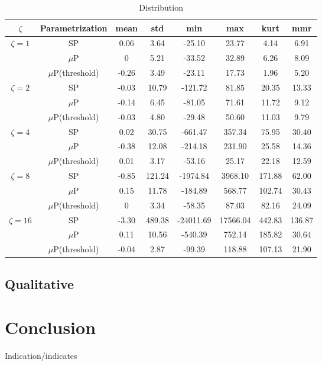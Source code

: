 \documentclass{article}
\newcommand{\mup}{$\mu$P}
\begin{document}
\begin{table}[h!]
\centering
\begin{tabular}{cccccccc}
\toprule
$\zeta$ & Parametrization & mean & std & min & max & kurt & mmr\\
\midrule
\multirow{3}{*}{$\zeta=1$} & SP & 0.06 & 3.64 & -25.10 & 23.77 & 4.14 & 6.91 \\
& \mup & 0 & 5.21 & -33.52 & 32.89 & 6.26 & 8.09 \\
& \mup (threshold) & -0.26 & 3.49 & -23.11 & 17.73 & 1.96 & 5.20 \\
\cmidrule{1-8}
\multirow{3}{*}{$\zeta=2$} & SP & -0.03 & 10.79 & -121.72 & 81.85 & 20.35 & 13.33 \\
& \mup & -0.14 & 6.45 & -81.05 & 71.61 & 11.72 & 9.12 \\
& \mup (threshold) & -0.03 & 4.80 & -29.48 & 50.60 & 11.03 & 9.79 \\
\cmidrule{1-8}
\multirow{3}{*}{$\zeta=4$} & SP & 0.02 & 30.75 & -661.47 & 357.34 & 75.95 & 30.40 \\
& \mup & -0.38 & 12.08 & -214.18 & 231.90 & 25.58 & 14.36 \\
& \mup (threshold) & 0.01 & 3.17 & -53.16 & 25.17 & 22.18 & 12.59 \\
\cmidrule{1-8}
\multirow{3}{*}{$\zeta=8$} & SP & -0.85 & 121.24 & -1974.84 & 3968.10 & 171.88 & 62.00 \\
& \mup & 0.15 & 11.78 & -184.89 & 568.77 & 102.74 & 30.43 \\
& \mup (threshold) & 0 & 3.34 & -58.35 & 87.03 & 82.16 & 24.09 \\
\cmidrule{1-8}
\multirow{3}{*}{$\zeta=16$} & SP & -3.30 & 489.38 & -24011.69 & 17566.04 & 442.83 & 136.87 \\
& \mup & 0.11 & 10.56 & -540.39 & 752.14 & 185.82 & 30.64 \\
& \mup (threshold) & -0.04 & 2.87 & -99.39 & 118.88 & 107.13 & 21.90 \\
\bottomrule
\end{tabular}
\caption{Distribution}
\end{table}

\subsection{Qualitative}

\section{Conclusion}
Indication/indicates

\printbibliography
\end{document}
